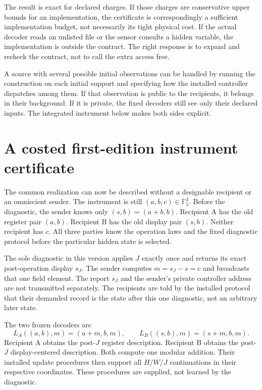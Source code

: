 The result is exact for declared charges. If those charges are conservative upper bounds for an implementation, the certificate is correspondingly a sufficient implementation budget, not necessarily its tight physical cost. If the actual decoder reads an unlisted file or the sensor consults a hidden variable, the implementation is outside the contract. The right response is to expand and recheck the contract, not to call the extra access free.

A source with several possible initial observations can be handled by running the construction on each initial support and specifying how the installed controller dispatches among them. If that observation is public to the recipients, it belongs in their background. If it is private, the fixed decoders still see only their declared inputs. The integrated instrument below makes both sides explicit.

\section{A costed first-edition instrument certificate}\label{MU:sec:first-ledger}
The common realization can now be described without a designable recipient or an omniscient sender. The instrument is still $(a,b,c)\in\mathbb F_5^3$. Before the diagnostic, the sender knows only $(s,b)=(a+b,b)$. Recipient A has the old register pair $(a,b)$. Recipient B has the old display pair $(s,b)$. Neither recipient has $c$. All three parties know the operation laws and the fixed diagnostic protocol before the particular hidden state is selected.

The sole diagnostic in this version applies $J$ exactly once and returns its exact post-operation display $s_J$. The sender computes $m=s_J-s=c$ and broadcasts that one field element. The report $s_J$ and the sender's private controller address are not transmitted separately. The recipients are told by the installed protocol that their demanded record is the state after this one diagnostic, not an arbitrary later state.

The two frozen decoders are
\begin{equation}\label{MU:eq:fixed-instrument-decoders}
L_A((a,b),m)=(a+m,b,m),\qquad
L_B((s,b),m)=(s+m,b,m).
\end{equation}
Recipient A obtains the post-$J$ register description. Recipient B obtains the post-$J$ display-centered description. Both compute one modular addition. Their installed update procedures then support all $H/W/J$ continuations in their respective coordinates. These procedures are supplied, not learned by the diagnostic.

